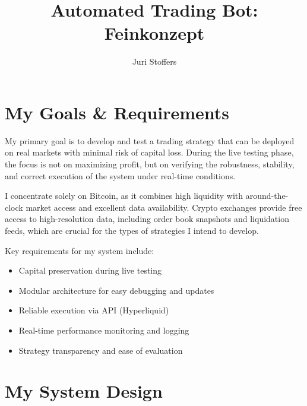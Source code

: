 \documentclass[9pt,a4paper,twocolumn,twoside]{tau-class/tau}
\title{Automated Trading Bot: Feinkonzept}
\author[a,1]{Juri Stoffers}
\affil[a]{Gymthun}
\begin{document}
\maketitle
\thispagestyle{firststyle}


\section{ My Goals \& Requirements}

My primary goal is to develop and test a trading strategy that can be deployed on real markets with minimal risk of capital loss. During the live testing phase, the focus is not on maximizing profit, but on verifying the robustness, stability, and correct execution of the system under real-time conditions.

I concentrate solely on Bitcoin, as it combines high liquidity with around-the-clock market access and excellent data availability. Crypto exchanges provide free access to high-resolution data, including order book snapshots and liquidation feeds, which are crucial for the types of strategies I intend to develop.

Key requirements for my system include:
\begin{itemize}
  \item Capital preservation during live testing
  \item Modular architecture for easy debugging and updates
  \item Reliable execution via API (Hyperliquid)
  \item Real-time performance monitoring and logging
  \item Strategy transparency and ease of evaluation
\end{itemize}




\section{ My System Design}
\end{document}
